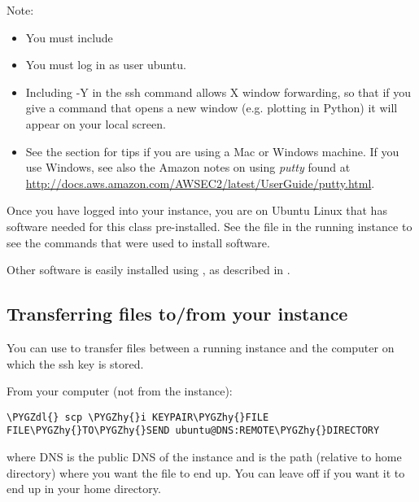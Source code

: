 \documentclass[letterpaper,10pt,english]{sphinxmanual}
\def\PYGZdl{\char`\$}
\def\PYGZhy{\char`\-}
\begin{document}
Note:
\begin{itemize}
\item {} 
You must include 

\item {} 
You must log in as user ubuntu.

\item {} 
Including -Y in the ssh command allows X window forwarding, so that if you
give a command that opens a new window (e.g. plotting in Python) it will
appear on your local screen.

\item {} 
See the section {\hyperref[ssh:ssh]{}} for tips if you are using a Mac or Windows
machine.
If you use Windows, see also the Amazon notes on using \emph{putty} found at
\url{http://docs.aws.amazon.com/AWSEC2/latest/UserGuide/putty.html}.

\end{itemize}

Once you have logged into your instance, you are on Ubuntu Linux that has
software needed for this class pre-installed.  See the file  in
the running instance to see the commands that were used to install software.

Other software is easily installed using , as described
in {\hyperref[software_installation:software\string-installation]{}}.


\subsection{Transferring files to/from your instance}
\label{aws:transferring-files-to-from-your-instance}
You can use  to transfer files between a running instance and
the computer on which the ssh key is stored.

From your computer (not from the instance):

\begin{Verbatim}[commandchars=\\\{\}]
\PYGZdl{} scp \PYGZhy{}i KEYPAIR\PYGZhy{}FILE FILE\PYGZhy{}TO\PYGZhy{}SEND ubuntu@DNS:REMOTE\PYGZhy{}DIRECTORY
\end{Verbatim}

where DNS is the public DNS of the instance and  is
the path (relative to home directory)
where you want the file to end up.  You can leave off
 if you want it to end up in your home directory.
\end{document}
